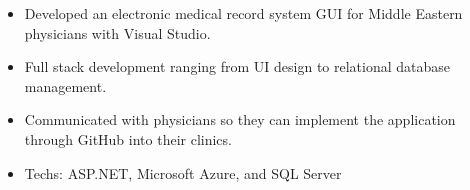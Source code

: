 \documentclass[10pt,letter]{altacv}
\begin{document}
\divider

%



\begin{itemize}
  \item \small{Developed an electronic medical record system GUI for Middle Eastern physicians with Visual Studio.}
  \item \small Full stack development ranging from UI design to relational database management.
    \item \small {Communicated with physicians so they can implement the application through GitHub into their clinics.}
  \item Techs: ASP.NET, Microsoft Azure, and SQL Server
\end{itemize}











\end{document}
